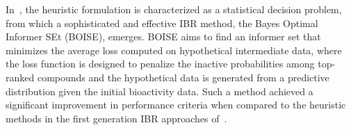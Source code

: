 \documentclass[11pt,a4paper]{article}
\theoremstyle{plain}
\begin{document}
In~\cite{yu_bayes_2022}, the heuristic formulation is characterized as a statistical decision problem, from which a sophisticated and effective IBR method, the Bayes Optimal Informer SEt (BOISE), emerges.
BOISE aims to find an informer set that minimizes the average loss computed on hypothetical intermediate data, where the loss function is designed to penalize the inactive probabilities among top-ranked compounds and the hypothetical data is generated from a predictive distribution given the initial bioactivity data. 
Such a method achieved a significant improvement in performance criteria when compared to the heuristic methods in the first generation IBR approaches of~\cite{zhang_predicting_2019}.
\end{document}
